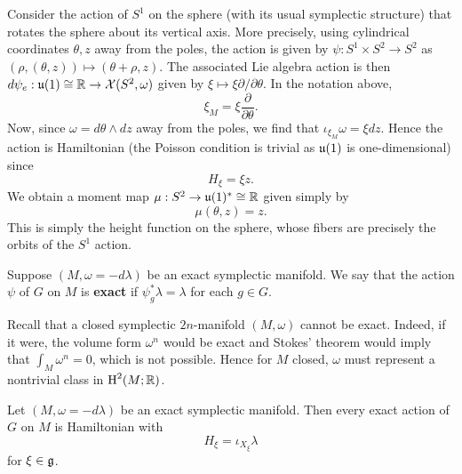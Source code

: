 \documentclass{amsart}
\begin{document}
\begin{example}
    Consider the action of $S^1$ on the sphere (with its usual symplectic structure)
    that rotates the sphere about its vertical axis. More precisely, using cylindrical
    coordinates $\theta,z$ away from the poles, the action is given by $\psi:S^1\times S^2\to S^2$
    as $(\rho, (\theta,z))\mapsto (\theta+\rho,z)$. The associated Lie algebra
    action is then $d\psi_e:\mathfrak u(1)\cong\mathbb{R}\to \mathcal{X}(S^2,\omega)$ given by
    $\xi\mapsto \xi\partial/\partial\theta$. In the notation above,
    \begin{equation*}
        \xi_M = \xi\frac{\partial}{\partial\theta}.
    \end{equation*}
    Now, since $\omega=d\theta\wedge dz$ away from the poles, we find that
    $\iota_{\xi_M} \omega = \xi dz$. Hence the action is Hamiltonian (the Poisson condition
    is trivial as $\mathfrak u(1)$ is one-dimensional) since 
    \begin{equation*}
        H_\xi=\xi z.
    \end{equation*}
    We obtain a moment map $\mu:S^2\to\mathfrak u(1)^*\cong\mathbb{R}$ given simply by
    \begin{equation*}
        \mu(\theta,z) = z.
    \end{equation*}
    This is simply the height function on the sphere, whose fibers are precisely
    the orbits of the $S^1$ action.
\end{example}

\begin{definition}
    Suppose $(M,\omega=-d\lambda)$ be an exact symplectic manifold. We say that the
    action $\psi$ of $G$ on $M$ is \textbf{exact} if $\psi^*_g\lambda=\lambda$ for each
    $g\in G$.
\end{definition}

\begin{remark}
    Recall that a closed symplectic $2n$-manifold $(M,\omega)$ cannot be exact. Indeed,
    if it were, the volume form $\omega^n$ would be exact and Stokes' theorem would imply
    that $\int_M\omega^n=0$, which is not possible. Hence for $M$ closed, $\omega$ must
    represent a nontrivial class in $\operatorname{H}^{2}(M;\mathbb{R})$.
\end{remark}

\begin{proposition}
    Let $(M,\omega=-d\lambda)$ be an exact symplectic manifold. Then every exact action of $G$
    on $M$ is Hamiltonian with
    \begin{equation*}
        H_\xi = \iota_{X_\xi}\lambda
    \end{equation*}
    for $\xi\in\mathfrak g$.
\end{proposition}
\end{document}
